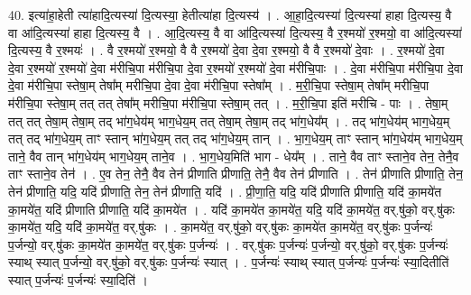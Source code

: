 \documentclass[17pt]{extarticle}
\begin{document}
40. इत्या॑हा॒हेती त्या॑हादि॒त्यस्या॑ दि॒त्यस्या॒ हेतीत्या॑हा दि॒त्यस्य॑ । . आ॒हा॒दि॒त्यस्या॑ दि॒त्यस्या॑ हाहा दि॒त्यस्य॒ वै वा आ॑दि॒त्यस्या॑ हाहा दि॒त्यस्य॒ वै । . आ॒दि॒त्यस्य॒ वै वा आ॑दि॒त्यस्या॑ दि॒त्यस्य॒ वै र॒श्मयो॑ र॒श्मयो॒ वा आ॑दि॒त्यस्या॑ दि॒त्यस्य॒ वै र॒श्मयः॑ । . वै र॒श्मयो॑ र॒श्मयो॒ वै वै र॒श्मयो॑ दे॒वा दे॒वा र॒श्मयो॒ वै वै र॒श्मयो॑ दे॒वाः । . र॒श्मयो॑ दे॒वा दे॒वा र॒श्मयो॑ र॒श्मयो॑ दे॒वा म॑रीचि॒पा म॑रीचि॒पा दे॒वा र॒श्मयो॑ र॒श्मयो॑ दे॒वा म॑रीचि॒पाः । . दे॒वा म॑रीचि॒पा म॑रीचि॒पा दे॒वा दे॒वा म॑रीचि॒पा स्तेषा॒म् तेषा᳚म् मरीचि॒पा दे॒वा दे॒वा म॑रीचि॒पा स्तेषा᳚म् । . म॒री॒चि॒पा स्तेषा॒म् तेषा᳚म् मरीचि॒पा म॑रीचि॒पा स्तेषा॒म् तत् तत् तेषा᳚म् मरीचि॒पा म॑रीचि॒पा स्तेषा॒म् तत् । . म॒री॒चि॒पा इति॑ मरीचि - पाः । . तेषा॒म् तत् तत् तेषा॒म् तेषा॒म् तद् भा॑ग॒धेय॑म् भाग॒धेय॒म् तत् तेषा॒म् तेषा॒म् तद् भा॑ग॒धेय᳚म् । . तद् भा॑ग॒धेय॑म् भाग॒धेय॒म् तत् तद् भा॑ग॒धेय॒म् ताꣳ स्तान् भा॑ग॒धेय॒म् तत् तद् भा॑ग॒धेय॒म् तान् । . भा॒ग॒धेय॒म् ताꣳ स्तान् भा॑ग॒धेय॑म् भाग॒धेय॒म् ताने॒ वैव तान् भा॑ग॒धेय॑म् भाग॒धेय॒म् ताने॒व । . भा॒ग॒धेय॒मिति॑ भाग - धेय᳚म् । . ताने॒ वैव ताꣳ स्ताने॒व तेन॒ तेनै॒व ताꣳ स्ताने॒व तेन॑ । . ए॒व तेन॒ तेनै॒ वैव तेन॑ प्रीणाति प्रीणाति॒ तेनै॒ वैव तेन॑ प्रीणाति । . तेन॑ प्रीणाति प्रीणाति॒ तेन॒ तेन॑ प्रीणाति॒ यदि॒ यदि॑ प्रीणाति॒ तेन॒ तेन॑ प्रीणाति॒ यदि॑ । . प्री॒णा॒ति॒ यदि॒ यदि॑ प्रीणाति प्रीणाति॒ यदि॑ का॒मये॑त का॒मये॑त॒ यदि॑ प्रीणाति प्रीणाति॒ यदि॑ का॒मये॑त । . यदि॑ का॒मये॑त का॒मये॑त॒ यदि॒ यदि॑ का॒मये॑त॒ वर्.षु॑को॒ वर्.षु॑कः का॒मये॑त॒ यदि॒ यदि॑ का॒मये॑त॒ वर्.षु॑कः । . का॒मये॑त॒ वर्.षु॑को॒ वर्.षु॑कः का॒मये॑त का॒मये॑त॒ वर्.षु॑कः प॒र्जन्यः॑ प॒र्जन्यो॒ वर्.षु॑कः का॒मये॑त का॒मये॑त॒ वर्.षु॑कः प॒र्जन्यः॑ । . वर्.षु॑कः प॒र्जन्यः॑ प॒र्जन्यो॒ वर्.षु॑को॒ वर्.षु॑कः प॒र्जन्यः॑ स्याथ् स्यात् प॒र्जन्यो॒ वर्.षु॑को॒ वर्.षु॑कः प॒र्जन्यः॑ स्यात् । . प॒र्जन्यः॑ स्याथ् स्यात् प॒र्जन्यः॑ प॒र्जन्यः॑ स्या॒दितीति॑ स्यात् प॒र्जन्यः॑ प॒र्जन्यः॑ स्या॒दिति॑ । \newline
\pagebreak
{}
\end{document}
